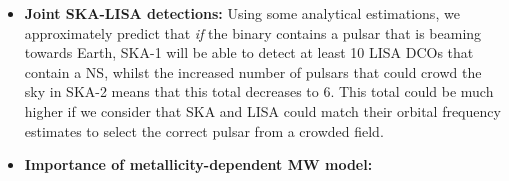 \begin{itemize}
    \item \textbf{Joint SKA-LISA detections:} Using some analytical estimations, we approximately predict that \textit{if} the binary contains a pulsar that is beaming towards Earth, SKA-1 will be able to detect at least 10 LISA DCOs that contain a NS, whilst the increased number of pulsars that could crowd the sky in SKA-2 means that this total decreases to 6. This total could be much higher if we consider that SKA and LISA could match their orbital frequency estimates to select the correct pulsar from a crowded field.
    \item \textbf{Importance of metallicity-dependent MW model:} 
\end{itemize}